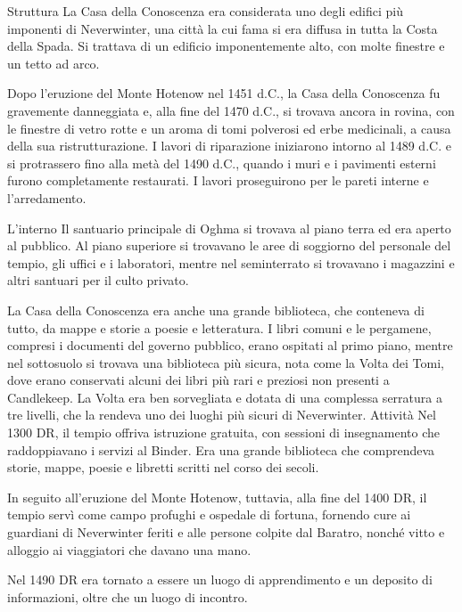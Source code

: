 \documentclass{article}
\begin{document}
Struttura\newline
La Casa della Conoscenza era considerata uno degli edifici più imponenti di Neverwinter, una città la cui fama si era diffusa in tutta la Costa della Spada. Si trattava di un edificio imponentemente alto, con molte finestre e un tetto ad arco.

Dopo l'eruzione del Monte Hotenow nel 1451 d.C., la Casa della Conoscenza fu gravemente danneggiata e, alla fine del 1470 d.C., si trovava ancora in rovina, con le finestre di vetro rotte e un aroma di tomi polverosi ed erbe medicinali, a causa della sua ristrutturazione. I lavori di riparazione iniziarono intorno al 1489 d.C. e si protrassero fino alla metà del 1490 d.C., quando i muri e i pavimenti esterni furono completamente restaurati. I lavori proseguirono per le pareti interne e l'arredamento.

L'interno\newline
Il santuario principale di Oghma si trovava al piano terra ed era aperto al pubblico. Al piano superiore si trovavano le aree di soggiorno del personale del tempio, gli uffici e i laboratori, mentre nel seminterrato si trovavano i magazzini e altri santuari per il culto privato.

La Casa della Conoscenza era anche una grande biblioteca, che conteneva di tutto, da mappe e storie a poesie e letteratura. I libri comuni e le pergamene, compresi i documenti del governo pubblico, erano ospitati al primo piano, mentre nel sottosuolo si trovava una biblioteca più sicura, nota come la Volta dei Tomi, dove erano conservati alcuni dei libri più rari e preziosi non presenti a Candlekeep. La Volta era ben sorvegliata e dotata di una complessa serratura a tre livelli, che la rendeva uno dei luoghi più sicuri di Neverwinter.
Attività\newline
Nel 1300 DR, il tempio offriva istruzione gratuita, con sessioni di insegnamento che raddoppiavano i servizi al Binder. Era una grande biblioteca che comprendeva storie, mappe, poesie e libretti scritti nel corso dei secoli.

In seguito all'eruzione del Monte Hotenow, tuttavia, alla fine del 1400 DR, il tempio servì come campo profughi e ospedale di fortuna, fornendo cure ai guardiani di Neverwinter feriti e alle persone colpite dal Baratro, nonché vitto e alloggio ai viaggiatori che davano una mano.

Nel 1490 DR era tornato a essere un luogo di apprendimento e un deposito di informazioni, oltre che un luogo di incontro.
\end{document}
